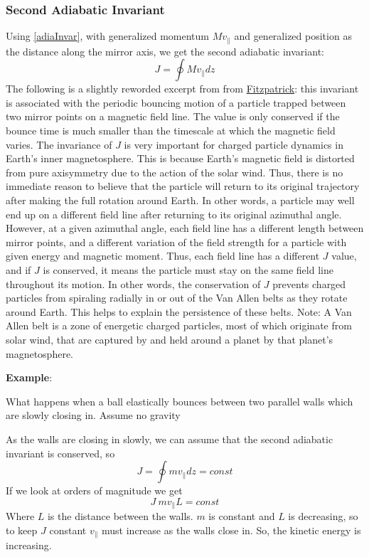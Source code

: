 \documentclass[12pt]{article}
\begin{document}
\subsubsection{Second Adiabatic Invariant}\label{subsecsecadia}
Using \eqref{adiaInvar}, with generalized momentum $Mv_{\parallel}$ and generalized position as the distance along the mirror axis, we get the second adiabatic invariant:
\begin{equation}\label{secondadia}
J=\oint Mv_{\parallel}dz
\end{equation}
The following is a slightly reworded excerpt from from \href{https://farside.ph.utexas.edu/teaching/plasma/lectures/node24.html}{Fitzpatrick}: this invariant is associated with the periodic bouncing motion of a particle trapped between two mirror points on a magnetic field line. The value is only conserved if the bounce time is much smaller than the timescale at which the magnetic field varies. The invariance of $J$ is very important for charged particle dynamics in Earth's inner magnetosphere. This is because Earth's magnetic field is distorted from pure axisymmetry due to the action of the solar wind. Thus, there is no immediate reason to believe that the particle will return to its original trajectory after making the full rotation around Earth. In other words, a particle may well end up on a different field line after returning to its original azimuthal angle. However, at a given azimuthal angle, each field line has a different length between mirror points, and a different variation of the field strength for a particle with given energy and magnetic moment. Thus, each field line has a different $J$ value, and if $J$ is conserved, it means the particle must stay on the same field line throughout its motion. In other words, the conservation of $J$ prevents charged particles from spiraling radially in or out of the Van Allen belts as they rotate around Earth. This helps to explain the persistence of these belts. Note: A Van Allen belt is a zone of energetic charged particles, most of which originate from solar wind, that are captured by and held around a planet by that planet's magnetosphere. 

\textbf{Example}:

\vspace{1mm}
What happens when a ball elastically bounces between two parallel walls which are slowly closing in. Assume no gravity
\vspace{1mm}

As the walls are closing in slowly, we can assume that the second adiabatic invariant is conserved, so
$$J=\oint mv_{\parallel}dz=const$$
If we look at orders of magnitude we get
$$J~mv_{\parallel}L=const$$
Where $L$ is the distance between the walls. $m$ is constant and $L$ is decreasing, so to keep $J$ constant $v_{\parallel}$ must increase as the walls close in. So, the kinetic energy is increasing.
\end{document}

